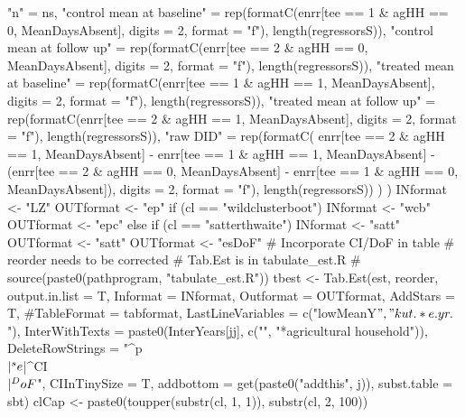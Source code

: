\begin{Schunk}
\begin{Sinput}
{{{{{{{                     "n" = ns,
                     "control mean at baseline" = 
                       rep(formatC(enrr[tee == 1 & agHH == 0, MeanDaysAbsent], 
                         digits = 2, format = "f"), length(regressorsS)),
                     "control mean at follow up" = 
                       rep(formatC(enrr[tee == 2 & agHH == 0, MeanDaysAbsent], 
                         digits = 2, format = "f"), length(regressorsS)),
                     "treated mean at baseline" =
                       rep(formatC(enrr[tee == 1 & agHH == 1, MeanDaysAbsent], 
                         digits = 2, format = "f"), length(regressorsS)),
                     "treated mean at follow up" =
                       rep(formatC(enrr[tee == 2 & agHH == 1, MeanDaysAbsent], 
                         digits = 2, format = "f"), length(regressorsS)),
                     "raw DID" =
                       rep(formatC(
                       enrr[tee == 2 & agHH == 1, MeanDaysAbsent] - enrr[tee == 1 & agHH == 1, MeanDaysAbsent] 
                       -(enrr[tee == 2 & agHH == 0, MeanDaysAbsent] - enrr[tee == 1 & agHH == 0, MeanDaysAbsent]), 
                         digits = 2, format = "f"), length(regressorsS))
                   )
                )
                INformat <- "LZ"
                OUTformat <- "ep"
                if (cl == "wildclusterboot") {
                  INformat <- "wcb"
                  OUTformat <- "epc"
                } else if (cl == "satterthwaite") {
                  INformat <- "satt"
                  OUTformat <- "satt"
                  OUTformat <- "esDoF"
                }
                # Incorporate CI/DoF in table
                # reorder needs to be corrected
                # Tab.Est is in tabulate_est.R
                # source(paste0(pathprogram, "tabulate_est.R"))
                tbest <- Tab.Est(est, reorder, output.in.list = T,
                  Informat = INformat, Outformat = OUTformat, 
                  AddStars = T, #TableFormat = tabformat,
                  LastLineVariables = c("lowMeanY$", "kut.*e.yr.$"),
                  InterWithTexts = paste0(InterYears[jj], c("", "*agricultural household")),
                  DeleteRowStrings = "^p\\$|^se\\$|^CI\\$|^DoF\\$",
                  CIInTinySize = T, 
                  addbottom = get(paste0("addthis", j)), subst.table = sbt)
                clCap <- paste0(toupper(substr(cl, 1, 1)), substr(cl, 2, 100))
}}}}}}}
\end{Sinput}
\end{Schunk}
